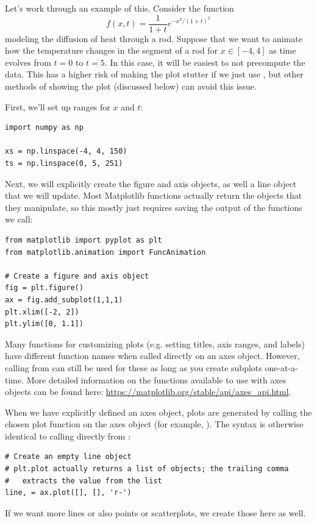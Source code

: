 \noindent
Let's work through an example of this.
Consider the function
\[
f(x,t) = \frac{1}{1+t}e^{-x^2/(1+t)^2}
\]
modeling the diffusion of heat through a rod.
Suppose that we want to animate how the temperature changes in the segment of a rod for $x\in [-4,4]$ as time evolves from $t=0$ to $t=5$.
In this case, it will be easiest to not precompute the data.
This has a higher risk of making the plot stutter if we just use , but other methods of showing the plot (discussed below) can avoid this issue.

First, we'll set up ranges for $x$ and $t$:
\begin{lstlisting}
import numpy as np

xs = np.linspace(-4, 4, 150)
ts = np.linspace(0, 5, 251)
\end{lstlisting}

Next, we will explicitly create the figure and axis objects, as well a line object that we will update.
Most Matplotlib functions actually return the objects that they manipulate, so this mostly just requires saving the output of the functions we call:
\begin{lstlisting}
from matplotlib import pyplot as plt
from matplotlib.animation import FuncAnimation

# Create a figure and axis object
fig = plt.figure()
ax = fig.add_subplot(1,1,1)
plt.xlim([-2, 2])
plt.ylim([0, 1.1])
\end{lstlisting}
\begin{info}
Many functions for customizing plots (e.g. setting titles, axis ranges, and labels) have different function names when called directly on an axes object.
However, calling from  can still be used for these as long as you create subplots one-at-a-time.
More detailed information on the functions available to use with axes objects can be found here: \url{https://matplotlib.org/stable/api/axes\_api.html}.
\end{info}
When we have explicitly defined an axes object, plots are generated by calling the chosen plot function on the axes object (for example, ).
The syntax is otherwise identical to calling directly from :
\begin{lstlisting}
# Create an empty line object
# plt.plot actually returns a list of objects; the trailing comma
#   extracts the value from the list
line, = ax.plot([], [], 'r-')
\end{lstlisting}
If we want more lines or also points or scatterplots, we create those here as well.

